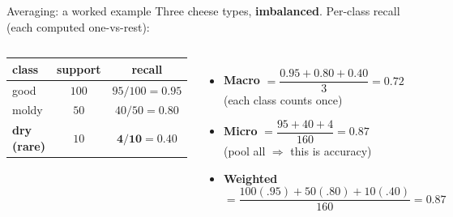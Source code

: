 \documentclass[aspectratio=169]{beamer}
\begin{document}
\begin{frame}{Averaging: a worked example}
  Three cheese types, \textbf{imbalanced}. Per-class recall (each computed one-vs-rest):
  \vskip 4pt
  \begin{columns}[T]
    \begin{center}\small
      \renewcommand{\arraystretch}{1.3}
      \begin{tabular}{l c c}
        class & support & recall \\
        \hline
        good  & $100$ & $95/100 = 0.95$ \\
        moldy & $50$  & $40/50 = 0.80$ \\
        \textbf{dry (rare)} & $10$ & $\mathbf{4/10 = 0.40}$ \\
        \hline
      \end{tabular}
    \end{center}
    \begin{itemize}\small
      \item \textbf{Macro} $= \dfrac{0.95+0.80+0.40}{3} = \mathbf{0.72}$ \\
        {\footnotesize (each class counts once)}
      \item \textbf{Micro} $= \dfrac{95+40+4}{160} = \mathbf{0.87}$ \\
        {\footnotesize (pool all $\Rightarrow$ this is accuracy)}
      \item \textbf{Weighted} $= \dfrac{100(.95)+50(.80)+10(.40)}{160} = \mathbf{0.87}$
    \end{itemize}
  \end{columns}
  \vfill
\end{frame}
\end{document}
